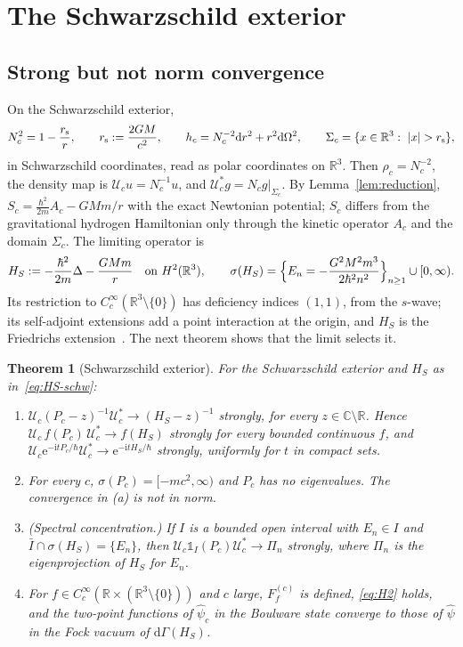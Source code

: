 \documentclass[%
 aip,
 jmp,
 amsmath,amssymb,
 reprint, onecolumn
]{revtex4-1}
\newtheorem{theorem}{Theorem}
\theoremstyle{definition}
\theoremstyle{remark}
\newcommand{\R}{\mathbb{R}}
\newcommand{\C}{\mathbb{C}}
\newcommand{\one}{\mathds{1}}
\newcommand{\rmd}{\mathrm{d}}
\newcommand{\rmi}{\mathrm{i}}
\newcommand{\rme}{\mathrm{e}}
\begin{document}
\section{The Schwarzschild exterior}\label{sec:schw}

\subsection{Strong but not norm convergence}

On the Schwarzschild exterior,
\[
N_c^2=1-\frac{r_{\rm s}}{r},\qquad r_{\rm s}:=\frac{2GM}{c^2},\qquad
h_c=N_c^{-2}\rmd r^2+r^2\rmd\Omega^2,\qquad
\Sigma_c=\{x\in\R^3:\ |x|>r_{\rm s}\},
\]
in Schwarzschild coordinates, read as polar coordinates on $\R^3$. Then
$\rho_c=N_c^{-2}$, the density map is $\mathcal{U}_cu=N_c^{-1}u$, and
$\mathcal{U}_c^*g=N_cg|_{\Sigma_c}$. By Lemma~\ref{lem:reduction},
$S_c=\frac{\hbar^2}{2m}A_c-GMm/r$ with the exact Newtonian potential;
$S_c$ differs from the gravitational hydrogen Hamiltonian only through
the kinetic operator $A_c$ and the domain $\Sigma_c$. The limiting
operator is
\begin{equation}\label{eq:HS-schw}
H_S:=-\frac{\hbar^2}{2m}\Delta-\frac{GMm}{r}\quad\text{on }H^2(\R^3),
\qquad \sigma(H_S)=\Bigl\{E_n=-\frac{G^2M^2m^3}{2\hbar^2n^2}\Bigr\}_{n\geq1}
\cup[0,\infty).
\end{equation}
Its restriction to $C_c^\infty(\R^3\setminus\{0\})$ has deficiency
indices $(1,1)$, from the $s$-wave; its self-adjoint extensions add a
point interaction at the origin, and $H_S$ is the Friedrichs
extension~\cite{Kato1995}. The next theorem shows that the limit
selects it.

\begin{theorem}[Schwarzschild exterior]\label{thm:schw}
For the Schwarzschild exterior and $H_S$ as in~\eqref{eq:HS-schw}:
\begin{enumerate}[label=(\alph*)]
\item $\mathcal{U}_c(P_c-z)^{-1}\mathcal{U}_c^*\to(H_S-z)^{-1}$ strongly,
for every $z\in\C\setminus\R$. Hence $\mathcal{U}_c\,f(P_c)\,
\mathcal{U}_c^*\to f(H_S)$ strongly for every bounded continuous $f$,
and $\mathcal{U}_c\rme^{-\rmi tP_c/\hbar}\mathcal{U}_c^*\to
\rme^{-\rmi tH_S/\hbar}$ strongly, uniformly for $t$ in compact sets.
\item For every $c$, $\sigma(P_c)=[-mc^2,\infty)$ and $P_c$ has no
eigenvalues. The convergence in (a) is not in norm.
\item (Spectral concentration.) If $I$ is a bounded open interval with
$E_n\in I$ and $\bar I\cap\sigma(H_S)=\{E_n\}$, then $\mathcal{U}_c\one_I(P_c)
\mathcal{U}_c^*\to\Pi_n$ strongly, where $\Pi_n$ is the eigenprojection
of $H_S$ for $E_n$.
\item For $f\in C_c^\infty(\R\times(\R^3\setminus\{0\}))$ and $c$ large,
$F_f^{(c)}$ is defined, \eqref{eq:H2} holds, and the two-point functions
of $\hat\psi_c$ in the Boulware state converge to those of $\hat\psi$ in
the Fock vacuum of $\rmd\Gamma(H_S)$.
\end{enumerate}
\end{theorem}
\end{document}
